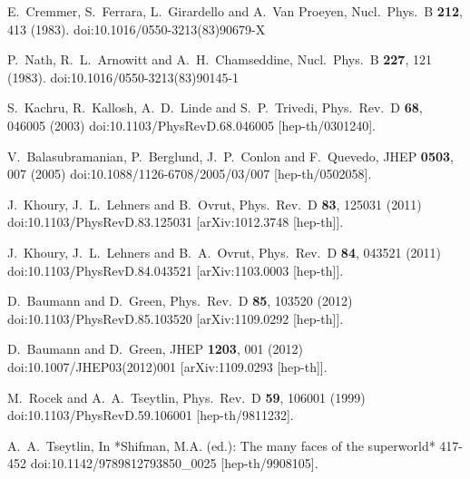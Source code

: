 \documentclass[12pt]{article}
\begin{document}
\begin{thebibliography}{99}
  E.~Cremmer, S.~Ferrara, L.~Girardello and A.~Van Proeyen,
  Nucl.\ Phys.\ B {\bf 212}, 413 (1983).
  doi:10.1016/0550-3213(83)90679-X

  P.~Nath, R.~L.~Arnowitt and A.~H.~Chamseddine,
  Nucl.\ Phys.\ B {\bf 227}, 121 (1983).
  doi:10.1016/0550-3213(83)90145-1

  S.~Kachru, R.~Kallosh, A.~D.~Linde and S.~P.~Trivedi,
  Phys.\ Rev.\ D {\bf 68}, 046005 (2003)
  doi:10.1103/PhysRevD.68.046005
  [hep-th/0301240].

  V.~Balasubramanian, P.~Berglund, J.~P.~Conlon and F.~Quevedo,
  JHEP {\bf 0503}, 007 (2005)
  doi:10.1088/1126-6708/2005/03/007
  [hep-th/0502058].

  J.~Khoury, J.~L.~Lehners and B.~Ovrut,
  Phys.\ Rev.\ D {\bf 83}, 125031 (2011)
  doi:10.1103/PhysRevD.83.125031
  [arXiv:1012.3748 [hep-th]].

  J.~Khoury, J.~L.~Lehners and B.~A.~Ovrut,
  Phys.\ Rev.\ D {\bf 84}, 043521 (2011)
  doi:10.1103/PhysRevD.84.043521
  [arXiv:1103.0003 [hep-th]].

  D.~Baumann and D.~Green,
  Phys.\ Rev.\ D {\bf 85}, 103520 (2012)
  doi:10.1103/PhysRevD.85.103520
  [arXiv:1109.0292 [hep-th]].

  D.~Baumann and D.~Green,
  JHEP {\bf 1203}, 001 (2012)
  doi:10.1007/JHEP03(2012)001
  [arXiv:1109.0293 [hep-th]].

  M.~Rocek and A.~A.~Tseytlin,
  Phys.\ Rev.\ D {\bf 59}, 106001 (1999)
  doi:10.1103/PhysRevD.59.106001
  [hep-th/9811232].

  A.~A.~Tseytlin,
  In *Shifman, M.A. (ed.): The many faces of the superworld* 417-452
  doi:10.1142/9789812793850\_0025
  [hep-th/9908105].


\end{thebibliography}
\end{document}

